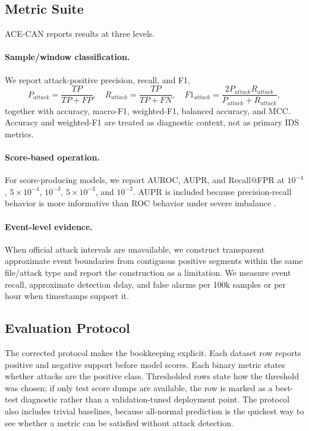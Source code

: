 \documentclass[runningheads]{llncs}
\newcommand{\framework}{ACE-CAN}
\begin{document}
\subsection{Metric Suite}
\framework{} reports results at three levels.
\paragraph{Sample/window classification.}  We report attack-positive precision, recall, and F1,
\begin{equation}
    P_{attack}=\frac{TP}{TP+FP}, \quad R_{attack}=\frac{TP}{TP+FN}, \quad
    F1_{attack}=\frac{2P_{attack}R_{attack}}{P_{attack}+R_{attack}},
\end{equation}
together with accuracy, macro-F1, weighted-F1, balanced accuracy, and MCC.  Accuracy and weighted-F1 are treated as diagnostic context, not as primary IDS metrics.
\paragraph{Score-based operation.}  For score-producing models, we report AUROC, AUPR, and Recall@FPR at $10^{-4}$, $5\times10^{-4}$, $10^{-3}$, $5\times10^{-3}$, and $10^{-2}$.  AUPR is included because precision-recall behavior is more informative than ROC behavior under severe imbalance \cite{davis2006pr,saito2015pr}.
\paragraph{Event-level evidence.}  When official attack intervals are unavailable, we construct transparent approximate event boundaries from contiguous positive segments within the same file/attack type and report the construction as a limitation.  We measure event recall, approximate detection delay, and false alarms per 100k samples or per hour when timestamps support it.

\subsection{Evaluation Protocol}
The corrected protocol makes the bookkeeping explicit.  Each dataset row reports positive and negative support before model scores.  Each binary metric states whether attacks are the positive class.  Thresholded rows state how the threshold was chosen; if only test score dumps are available, the row is marked as a best-test diagnostic rather than a validation-tuned deployment point.  The protocol also includes trivial baselines, because all-normal prediction is the quickest way to see whether a metric can be satisfied without attack detection.
\end{document}
